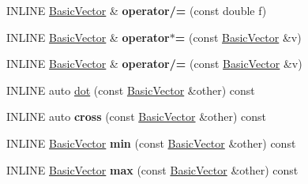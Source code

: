 \begin{DoxyCompactItemize}
I\+N\+L\+I\+NE \hyperlink{classBasicVector}{Basic\+Vector} \& {\bfseries operator/=} (const double f)
\item 
\hypertarget{classBasicVector_3_01double_01_4_a316cd710c684228f8bd37615cd54ed8f}{}\label{classBasicVector_3_01double_01_4_a316cd710c684228f8bd37615cd54ed8f} 
I\+N\+L\+I\+NE \hyperlink{classBasicVector}{Basic\+Vector} \& {\bfseries operator$\ast$=} (const \hyperlink{classBasicVector}{Basic\+Vector} \&v)
\item 
\hypertarget{classBasicVector_3_01double_01_4_a8f6377bdf375db538885158f916ec740}{}\label{classBasicVector_3_01double_01_4_a8f6377bdf375db538885158f916ec740} 
I\+N\+L\+I\+NE \hyperlink{classBasicVector}{Basic\+Vector} \& {\bfseries operator/=} (const \hyperlink{classBasicVector}{Basic\+Vector} \&v)
\item 
I\+N\+L\+I\+NE auto \hyperlink{classBasicVector_3_01double_01_4_a9ef4881becf50b273cfae52c89fcd5fc}{dot} (const \hyperlink{classBasicVector}{Basic\+Vector} \&other) const
\item 
\hypertarget{classBasicVector_3_01double_01_4_a66dbd7f7642c85a67d2074fa50964ce7}{}\label{classBasicVector_3_01double_01_4_a66dbd7f7642c85a67d2074fa50964ce7} 
I\+N\+L\+I\+NE auto {\bfseries cross} (const \hyperlink{classBasicVector}{Basic\+Vector} \&other) const
\item 
\hypertarget{classBasicVector_3_01double_01_4_add45e0f90db54f40436eb5aa4fb3cd31}{}\label{classBasicVector_3_01double_01_4_add45e0f90db54f40436eb5aa4fb3cd31} 
I\+N\+L\+I\+NE \hyperlink{classBasicVector}{Basic\+Vector} {\bfseries min} (const \hyperlink{classBasicVector}{Basic\+Vector} \&other) const
\item 
\hypertarget{classBasicVector_3_01double_01_4_a947199c61bb54d84becfbbd645309b5c}{}\label{classBasicVector_3_01double_01_4_a947199c61bb54d84becfbbd645309b5c} 
I\+N\+L\+I\+NE \hyperlink{classBasicVector}{Basic\+Vector} {\bfseries max} (const \hyperlink{classBasicVector}{Basic\+Vector} \&other) const
\end{DoxyCompactItemize}
